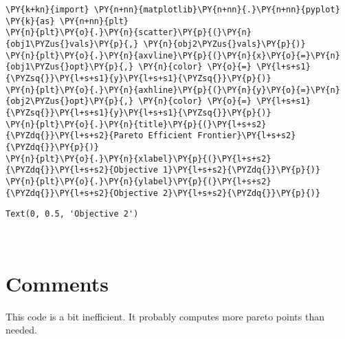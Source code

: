     \begin{tcolorbox}[breakable, size=fbox, boxrule=1pt, pad at break*=1mm,colback=cellbackground, colframe=cellborder]
\begin{Verbatim}[commandchars=\\\{\}]
\PY{k+kn}{import} \PY{n+nn}{matplotlib}\PY{n+nn}{.}\PY{n+nn}{pyplot} \PY{k}{as} \PY{n+nn}{plt}
\PY{n}{plt}\PY{o}{.}\PY{n}{scatter}\PY{p}{(}\PY{n}{obj1\PYZus{}vals}\PY{p}{,} \PY{n}{obj2\PYZus{}vals}\PY{p}{)}
\PY{n}{plt}\PY{o}{.}\PY{n}{axvline}\PY{p}{(}\PY{n}{x}\PY{o}{=}\PY{n}{obj1\PYZus{}opt}\PY{p}{,} \PY{n}{color} \PY{o}{=} \PY{l+s+s1}{\PYZsq{}}\PY{l+s+s1}{y}\PY{l+s+s1}{\PYZsq{}}\PY{p}{)}
\PY{n}{plt}\PY{o}{.}\PY{n}{axhline}\PY{p}{(}\PY{n}{y}\PY{o}{=}\PY{n}{obj2\PYZus{}opt}\PY{p}{,} \PY{n}{color} \PY{o}{=} \PY{l+s+s1}{\PYZsq{}}\PY{l+s+s1}{y}\PY{l+s+s1}{\PYZsq{}}\PY{p}{)}
\PY{n}{plt}\PY{o}{.}\PY{n}{title}\PY{p}{(}\PY{l+s+s2}{\PYZdq{}}\PY{l+s+s2}{Pareto Efficient Frontier}\PY{l+s+s2}{\PYZdq{}}\PY{p}{)}
\PY{n}{plt}\PY{o}{.}\PY{n}{xlabel}\PY{p}{(}\PY{l+s+s2}{\PYZdq{}}\PY{l+s+s2}{Objective 1}\PY{l+s+s2}{\PYZdq{}}\PY{p}{)}
\PY{n}{plt}\PY{o}{.}\PY{n}{ylabel}\PY{p}{(}\PY{l+s+s2}{\PYZdq{}}\PY{l+s+s2}{Objective 2}\PY{l+s+s2}{\PYZdq{}}\PY{p}{)}
\end{Verbatim}
\end{tcolorbox}

            \begin{tcolorbox}[breakable, size=fbox, boxrule=.5pt, pad at break*=1mm, opacityfill=0]
\begin{Verbatim}[commandchars=\\\{\}]
Text(0, 0.5, 'Objective 2')
\end{Verbatim}
\end{tcolorbox}
        
    \begin{center}
    \end{center}
    { \hspace*{\fill} \\}
    
    \hypertarget{comments}{%
\section{Comments}\label{comments}}

This code is a bit inefficient. It probably computes more pareto points
than needed.



